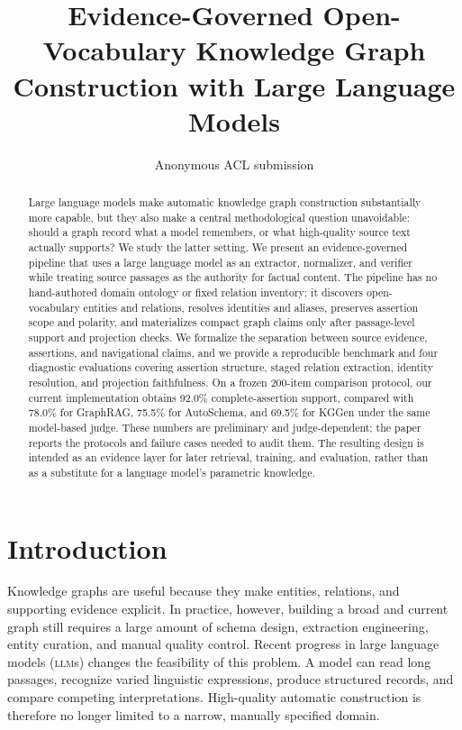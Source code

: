\documentclass[11pt]{article}
\title{Evidence-Governed Open-Vocabulary Knowledge Graph Construction with Large Language Models}
\author{Anonymous ACL submission}
\newcommand{\llms}{\textsc{llm}s}
\begin{document}
\maketitle

\begin{abstract}
Large language models make automatic knowledge graph construction substantially more capable, but they also make a central methodological question unavoidable: should a graph record what a model remembers, or what high-quality source text actually supports? We study the latter setting. We present an evidence-governed pipeline that uses a large language model as an extractor, normalizer, and verifier while treating source passages as the authority for factual content. The pipeline has no hand-authored domain ontology or fixed relation inventory: it discovers open-vocabulary entities and relations, resolves identities and aliases, preserves assertion scope and polarity, and materializes compact graph claims only after passage-level support and projection checks. We formalize the separation between source evidence, assertions, and navigational claims, and we provide a reproducible benchmark and four diagnostic evaluations covering assertion structure, staged relation extraction, identity resolution, and projection faithfulness. On a frozen 200-item comparison protocol, our current implementation obtains 92.0\% complete-assertion support, compared with 78.0\% for GraphRAG, 75.5\% for AutoSchema, and 69.5\% for KGGen under the same model-based judge. These numbers are preliminary and judge-dependent; the paper reports the protocols and failure cases needed to audit them. The resulting design is intended as an evidence layer for later retrieval, training, and evaluation, rather than as a substitute for a language model's parametric knowledge.
\end{abstract}

\section{Introduction}
\label{sec:intro}

Knowledge graphs are useful because they make entities, relations, and supporting evidence explicit. In practice, however, building a broad and current graph still requires a large amount of schema design, extraction engineering, entity curation, and manual quality control. Recent progress in large language models (\llms{}) changes the feasibility of this problem. A model can read long passages, recognize varied linguistic expressions, produce structured records, and compare competing interpretations. High-quality automatic construction is therefore no longer limited to a narrow, manually specified domain.
\end{document}
